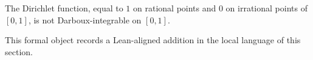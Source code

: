 \begin{remark*}
The Dirichlet function, equal to $1$ on rational points and $0$ on irrational points of $[0,1]$, is not Darboux-integrable on $[0,1]$.
\end{remark*}

\begin{remark*}[Interpretation]
This formal object records a Lean-aligned addition in the local language of this section.
\end{remark*}

\begin{dependencies}
\NoLocalDependencies
\end{dependencies}
